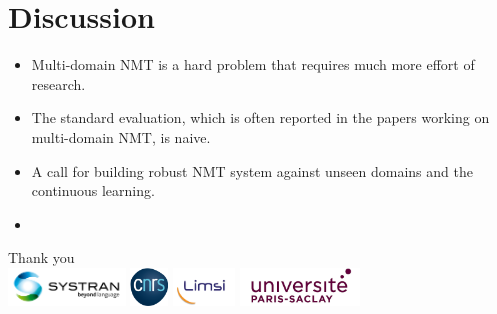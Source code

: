\documentclass{beamer}
\newcommand{\fyTodo}[1]{\Todo[FY:]{\textcolor{orange}{#1}}}
\begin{document}
\section{Discussion} %

\begin{frame}
\begin{itemize}
	\item Multi-domain NMT is a hard problem that requires much more effort of research.
	\item The standard evaluation, which is often reported in the papers working on multi-domain NMT, is naive.
	\item A call for building robust NMT system against unseen domains and the continuous learning.
	\item \fyTodo{To add more conclusions}
	
\end{itemize}
\end{frame}

\begin{frame}

\centering
\Huge
Thank you \\
\vspace{1.5cm}
    \includegraphics[height=1.0cm]{systran-logo.png}
    \includegraphics[height=1.0cm]{cnrs-logo.png}
    \includegraphics[height=1.0cm]{limsi-logo.png}
    \includegraphics[height=1.0cm]{ups-logo.png}
\end{frame}


\end{document}
